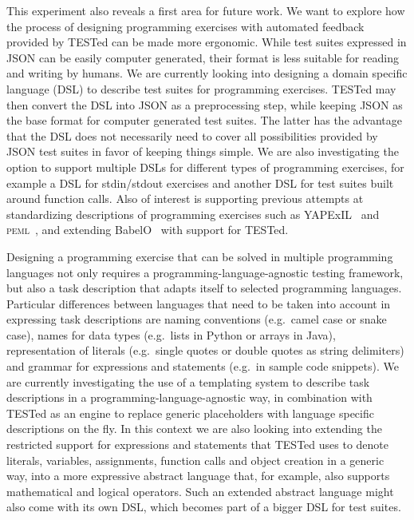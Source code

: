 \documentclass[../main]{subfiles}
\begin{document}
This experiment also reveals a first area for future work.
We want to explore how the process of designing programming exercises with automated feedback provided by TESTed can be made more ergonomic.
While test suites expressed in JSON can be easily computer generated, their format is less suitable for reading and writing by humans.
We are currently looking into designing a domain specific language (DSL) to describe test suites for programming exercises.
TESTed may then convert the DSL into JSON as a preprocessing step, while keeping JSON as the base format for computer generated test suites.
The latter has the advantage that the DSL does not necessarily need to cover all possibilities provided by JSON test suites in favor of keeping things simple.
We are also investigating the option to support multiple DSLs for different types of programming exercises, for example a DSL for stdin/stdout exercises and another DSL for test suites built around function calls.
Also of interest is supporting previous attempts at standardizing descriptions of programming exercises such as YAPExIL~\autocite{paivaAnotherProgrammingExercises2020} and \textsc{peml}~\autocite{cssplicepemlworkinggroupProgrammingExerciseMarkup2021}, and extending BabelO~\autocite{queirosBabeLOExtensibleConverter2013} with support for TESTed.

Designing a programming exercise that can be solved in multiple programming languages not only requires a programming-language-agnostic testing framework, but also a task description that adapts itself to selected programming languages.
Particular differences between languages that need to be taken into account in expressing task descriptions are naming conventions (e.g.\ camel case or snake case), names for data types (e.g.\ lists in Python or arrays in Java), representation of literals (e.g.\ single quotes or double quotes as string delimiters) and grammar for expressions and statements (e.g.\ in sample code snippets).
We are currently investigating the use of a templating system to describe task descriptions in a programming-language-agnostic way, in combination with TESTed as an engine to replace generic placeholders with language specific descriptions on the fly.
In this context we are also looking into extending the restricted support for expressions and statements that TESTed uses to denote literals, variables, assignments, function calls and object creation in a generic way, into a more expressive abstract language that, for example, also supports mathematical and logical operators.
Such an extended abstract language might also come with its own DSL, which becomes part of a bigger DSL for test suites.
\end{document}
